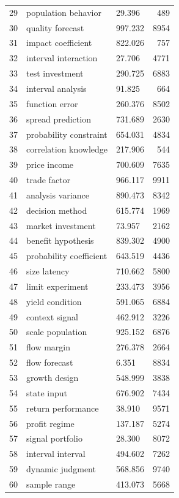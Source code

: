 \documentclass[11pt]{report}
\begin{document}
\begin{longtable}{rllr}
29 & population behavior & 29.396 & 489 \\
30 & quality forecast & 997.232 & 8954 \\
31 & impact coefficient & 822.026 & 757 \\
32 & interval interaction & 27.706 & 4771 \\
33 & test investment & 290.725 & 6883 \\
34 & interval analysis & 91.825 & 664 \\
35 & function error & 260.376 & 8502 \\
36 & spread prediction & 731.689 & 2630 \\
37 & probability constraint & 654.031 & 4834 \\
38 & correlation knowledge & 217.906 & 544 \\
39 & price income & 700.609 & 7635 \\
40 & trade factor & 966.117 & 9911 \\
41 & analysis variance & 890.473 & 8342 \\
42 & decision method & 615.774 & 1969 \\
43 & market investment & 73.957 & 2162 \\
44 & benefit hypothesis & 839.302 & 4900 \\
45 & probability coefficient & 643.519 & 4436 \\
46 & size latency & 710.662 & 5800 \\
47 & limit experiment & 233.473 & 3956 \\
48 & yield condition & 591.065 & 6884 \\
49 & context signal & 462.912 & 3226 \\
50 & scale population & 925.152 & 6876 \\
51 & flow margin & 276.378 & 2664 \\
52 & flow forecast & 6.351 & 8834 \\
53 & growth design & 548.999 & 3838 \\
54 & state input & 676.902 & 7434 \\
55 & return performance & 38.910 & 9571 \\
56 & profit regime & 137.187 & 5274 \\
57 & signal portfolio & 28.300 & 8072 \\
58 & interval interval & 494.602 & 7262 \\
59 & dynamic judgment & 568.856 & 9740 \\
60 & sample range & 413.073 & 5668 \\
\end{longtable}
\end{document}
